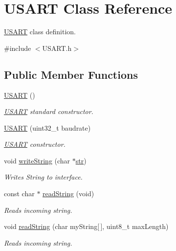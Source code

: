 \hypertarget{classUSART}{}\section{U\+S\+A\+RT Class Reference}
\label{classUSART}


\hyperlink{classUSART}{U\+S\+A\+RT} class definition.  




{\ttfamily \#include $<$U\+S\+A\+R\+T.\+h$>$}

\subsection*{Public Member Functions}
\begin{DoxyCompactItemize}
\item 
\hyperlink{classUSART_a538ccfb4c4ae821f4fd4e87afe9fd96e}{U\+S\+A\+RT} ()
\begin{DoxyCompactList}\small\item\em \hyperlink{classUSART}{U\+S\+A\+RT} standard constructor. \end{DoxyCompactList}\item 
\hyperlink{classUSART_a889e2ca93527fd03811fdff317f50f39}{U\+S\+A\+RT} (uint32\+\_\+t baudrate)
\begin{DoxyCompactList}\small\item\em \hyperlink{classUSART}{U\+S\+A\+RT} constructor. \end{DoxyCompactList}\item 
void \hyperlink{classUSART_a249b0d6967ead56f39448d4954835a27}{write\+String} (char $\ast$\hyperlink{main_8cpp_ac19b967928c4ef5b461808cbac40840c}{str})
\begin{DoxyCompactList}\small\item\em Writes String to interface. \end{DoxyCompactList}\item 
const char $\ast$ \hyperlink{classUSART_a7e56b380e59b576bbac13e60ca9ba829}{read\+String} (void)
\begin{DoxyCompactList}\small\item\em Reads incoming string. \end{DoxyCompactList}\item 
void \hyperlink{classUSART_a6c22ca3ab4707ade9a03a0293358f192}{read\+String} (char my\+String\mbox{[}$\,$\mbox{]}, uint8\+\_\+t max\+Length)
\begin{DoxyCompactList}\small\item\em Reads incoming string. \end{DoxyCompactList}\item 

\end{DoxyCompactItemize}
